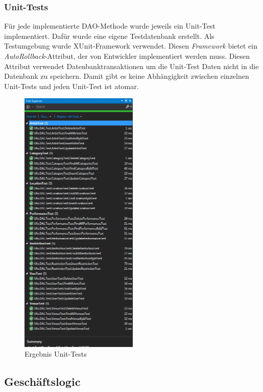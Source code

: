 \documentclass[12pt, a4paper]{article}
\begin{document}
\clearpage 
\subsubsection{Unit-Tests}

Für jede implementierte DAO-Methode wurde jeweils ein Unit-Test implementiert. Dafür wurde eine eigene Testdatenbank erstellt. Als Testumgebung wurde XUnit-Framework verwendet. Diesen \textit{Framework} bietet ein \textit{AutoRollback}-Attribut, der von Entwickler implementiert werden muss. Diesen Attribut verwendet Datenbanktransaktionen um die Unit-Test Daten nicht in die Datenbank zu speichern. Damit gibt es keine Abhängigkeit zwischen einzelnen Unit-Tests und jeden Unit-Test ist atomar.



\begin{figure}[h] 	
	\centering
		\includegraphics[width=0.5\textwidth]{UnitTests.png}
	\caption{Ergebnis Unit-Tests}
\end{figure}

\clearpage
\subsection{Geschäftslogic}
\end{document}
